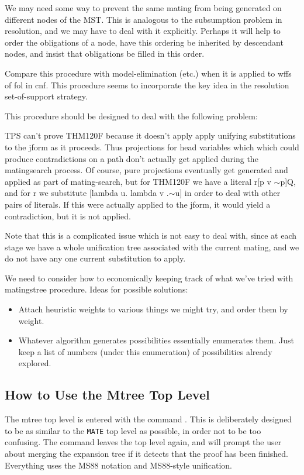 We may need some way to prevent the same mating from being generated on
different nodes of the MST. This is analogous to the subsumption problem
in resolution, and we may have to deal with it explicitly. Perhaps it will help
to order the obligations of a node, have this ordering be inherited by
descendant nodes, and insist that obligations be filled in this order.

Compare this procedure with model-elimination (etc.) when it is applied
to wffs of fol in cnf.
This procedure seems to incorporate the key idea in the resolution
set-of-support strategy.

        This procedure should be designed to deal with the following
problem:

	TPS can't prove THM120F because it doesn't apply apply
unifying substitutions to the jform as it proceeds. Thus projections
for head variables which which could produce contradictions on a path
don't actually get applied during the matingsearch process. Of course,
pure projections eventually get generated and applied as part of
mating-search, but for THM120F we have a literal r[p v $\sim$p]Q, and for
r we substitute [lambda u. lambda v .$\sim$u] in order to deal with other
pairs of literals. If this were actually applied to the jform, it would
yield a contradiction, but it is not applied.

	Note that this is a complicated issue which is not easy to
deal with, since at each stage we have a whole unification tree
associated with the current mating, and we do not have any one
current substitution to apply.

	We need to consider how to economically keeping track of what
we've tried with matingstree procedure. Ideas for possible solutions:
\begin{itemize}
\item Attach heuristic weights to various things we might try, and order
them by weight.

\item Whatever algorithm generates possibilities essentially enumerates
them. Just keep a list of numbers (under this enumeration) of
possibilities already explored.
\end{itemize}

\subsection{How to Use the Mtree Top Level}

The mtree top level is entered with the command . This is
deliberately designed to be as similar to the {\tt MATE} top level as possible,
in order not to be too confusing. The  command leaves the top level
again, and will prompt the user about merging the expansion tree if it detects that the
proof has been finished. Everything uses the MS88 notation and MS88-style unification.

